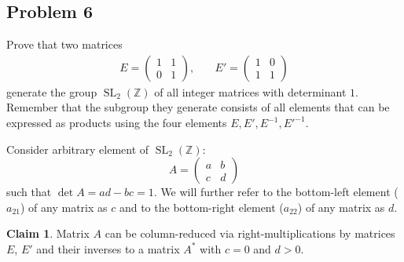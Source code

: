 \documentclass{article}
\theoremstyle{definition}
\newtheorem*{claim}{Claim}
\newcommand{\Z}{\mathbb{Z}}
\newcommand{\SL}[2]{\operatorname{SL}_{#1}(#2)}
\begin{document}
\subsection*{Problem 6}

\begin{tcolorbox}
Prove that two matrices
\begin{align*}
E =
    \begin{pmatrix}
        1 & 1 \\
        0 & 1
    \end{pmatrix},
\quad &
E' = 
    \begin{pmatrix}
        1 & 0 \\
        1 & 1
    \end{pmatrix}
\end{align*}
generate the group $\SL{2}{\Z}$ of all integer matrices with determinant $1$. 
Remember that the subgroup they generate consists of all elements that can be expressed as products using the four elements $E, E', E^{-1}, E'^{-1}$.
\end{tcolorbox}

Consider arbitrary element of $\SL{2}{\Z}$:
\[ A =
    \begin{pmatrix}
        a & b \\
        c & d
    \end{pmatrix}
\]
such that $\det A = ad - bc = 1$.
We will further refer to the bottom-left element ($a_{21}$) of any matrix as $c$ and to the bottom-right element ($a_{22}$) of any matrix as $d$.

\begin{claim}
Matrix $A$ can be column-reduced via right-multiplications by matrices $E$, $E'$ and their inverses to a matrix $A^*$ with $c = 0$ and $d > 0$.
\end{claim}
\end{document}
